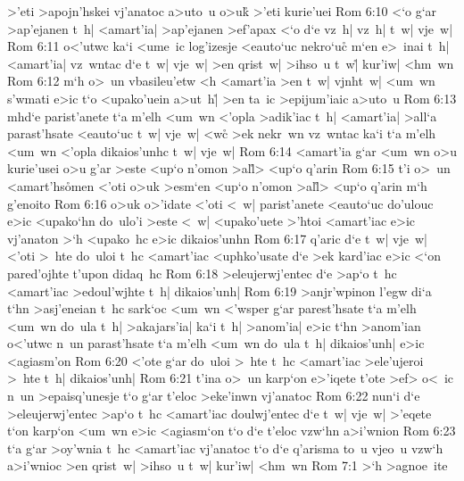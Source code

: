 >'eti
>apojn'hskei
vj'anatoc
a>uto~u
o>uk\r{}
>'eti
kurie'uei\bibvsend
\vs Rom 6:10
<`o
g`ar
>ap'ejanen
t~h|
<amart'ia|
>ap'ejanen
>ef'apax
<`o
d`e
vz~h|
vz~h|
t~w|
vje~w|\bibvsend
\vs Rom 6:11
o<'utwc
ka`i
<ume~ic
log'izesje
<eauto`uc
nekro`uc\r{}
m`en
e>~inai
t~h|
<amart'ia|
vz~wntac
d`e
t~w|
vje~w|
>en
qrist~w|
>ihso~u
t~w|\r{}
kur'iw|
<hm~wn\bibvsend
\vs Rom 6:12
m`h
o>~un
vbasileu'etw
<h
<amart'ia
>en
t~w|
vjnht~w|
<um~wn
s'wmati
e>ic
t`o
<upako'uein
a>ut~h|\r{}
>en
ta~ic
>epijum'iaic
a>uto~u\bibvsend
\vs Rom 6:13
mhd`e
parist'anete
t`a
m'elh
<um~wn
<'opla
>adik'iac
t~h|
<amart'ia|
>all`a
parast'hsate
<eauto`uc
t~w|
vje~w|
<w\r{c}
>ek
nekr~wn
vz~wntac
ka`i
t`a
m'elh
<um~wn
<'opla
dikaios'unhc
t~w|
vje~w|\bibvsend
\vs Rom 6:14
<amart'ia
g`ar
<um~wn
o>u
kurie'usei
o>u
g'ar
>este
<up`o
n'omon
>al\r{l}>
<up`o
q'arin\bibvsend
\vs Rom 6:15
t'i
o>~un
<amart'hs\r{o}men
<'oti
o>uk
>esm`en
<up`o
n'omon
>al\r{l}>
<up`o
q'arin
m`h
g'enoito\bibvsend
\vs Rom 6:16
o>uk
o>'idate
<'oti
<~w|
parist'anete
<eauto`uc
do'ulouc
e>ic
<upako`hn
do~ulo'i
>este
<~w|
<upako'uete
>'htoi
<amart'iac
e>ic
vj'anaton
>`h
<upako~hc
e>ic
dikaios'unhn\bibvsend
\vs Rom 6:17
q'aric
d`e
t~w|
vje~w|
<'oti
>~hte
do~uloi
t~hc
<amart'iac
<uphko'usate
d`e
>ek
kard'iac
e>ic
<`on
pared'ojhte
t'upon
didaq~hc\bibvsend
\vs Rom 6:18
>eleujerwj'entec
d`e
>ap`o
t~hc
<amart'iac
>edoul'wjhte
t~h|
dikaios'unh|\bibvsend
\vs Rom 6:19
>anjr'wpinon
l'egw
di`a
t`hn
>asj'eneian
t~hc
sark`oc
<um~wn
<'wsper
g`ar
parest'hsate
t`a
m'elh
<um~wn
do~ula
t~h|
>akajars'ia|
ka`i
t~h|
>anom'ia|
e>ic
t`hn
>anom'ian
o<'utwc
n~un
parast'hsate
t`a
m'elh
<um~wn
do~ula
t~h|
dikaios'unh|
e>ic
<agiasm'on\bibvsend
\vs Rom 6:20
<'ote
g`ar
do~uloi
>~hte
t~hc
<amart'iac
>ele'ujeroi
>~hte
t~h|
dikaios'unh|\bibvsend
\vs Rom 6:21
t'ina
o>~un
karp`on
e>'iqete
t'ote
>ef>
o<~ic
n~un
>epaisq'unesje
t`o
g`ar
t'eloc
>eke'inwn
vj'anatoc\bibvsend
\vs Rom 6:22
nun`i
d`e
>eleujerwj'entec
>ap`o
t~hc
<amart'iac
doulwj'entec
d`e
t~w|
vje~w|
>'eqete
t`on
karp`on
<um~wn
e>ic
<agiasm`on
t`o
d`e
t'eloc
vzw`hn
a>i'wnion\bibvsend
\vs Rom 6:23
t`a
g`ar
>oy'wnia
t~hc
<amart'iac
vj'anatoc
t`o
d`e
q'arisma
to~u
vjeo~u
vzw`h
a>i'wnioc
>en
qrist~w|
>ihso~u
t~w|
kur'iw|
<hm~wn\bibvsend
\vs Rom 7:1
>`h
>agnoe~ite
